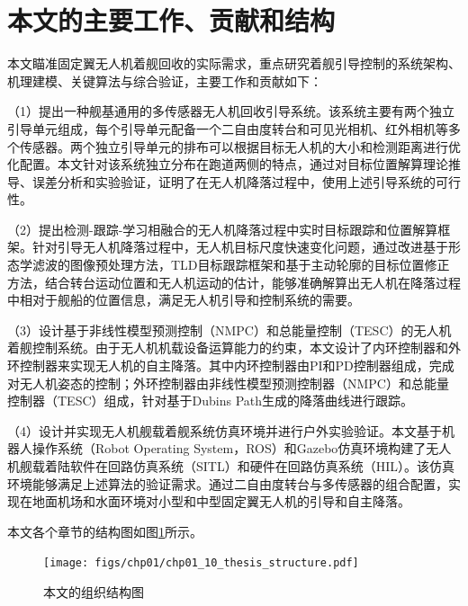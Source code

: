 \section{本文的主要工作、贡献和结构}
本文瞄准固定翼无人机着舰回收的实际需求，重点研究着舰引导控制的系统架构、机理建模、关键算法与综合验证，主要工作和贡献如下：

（1）提出一种舰基通用的多传感器无人机回收引导系统。该系统主要有两个独立引导单元组成，每个引导单元配备一个二自由度转台和可见光相机、红外相机等多个传感器。两个独立引导单元的排布可以根据目标无人机的大小和检测距离进行优化配置。本文针对该系统独立分布在跑道两侧的特点，通过对目标位置解算理论推导、误差分析和实验验证，证明了在无人机降落过程中，使用上述引导系统的可行性。

（2）提出检测-跟踪-学习相融合的无人机降落过程中实时目标跟踪和位置解算框架。针对引导无人机降落过程中，无人机目标尺度快速变化问题，通过改进基于形态学滤波的图像预处理方法，TLD目标跟踪框架和基于主动轮廓的目标位置修正方法，结合转台运动位置和无人机运动的估计，能够准确解算出无人机在降落过程中相对于舰船的位置信息，满足无人机引导和控制系统的需要。

（3）设计基于非线性模型预测控制（NMPC）和总能量控制（TESC）的无人机着舰控制系统。由于无人机机载设备运算能力的约束，本文设计了内环控制器和外环控制器来实现无人机的自主降落。其中内环控制器由PI和PD控制器组成，完成对无人机姿态的控制；外环控制器由非线性模型预测控制器（NMPC）和总能量控制器（TESC）组成，针对基于Dubins Path生成的降落曲线进行跟踪。

（4）设计并实现无人机舰载着舰系统仿真环境并进行户外实验验证。本文基于机器人操作系统（Robot Operating System，ROS）和Gazebo仿真环境构建了无人机舰载着陆软件在回路仿真系统（SITL）和硬件在回路仿真系统（HIL）。该仿真环境能够满足上述算法的验证需求。通过二自由度转台与多传感器的组合配置，实现在地面机场和水面环境对小型和中型固定翼无人机的引导和自主降落。

本文各个章节的结构图如图\ref{fig:chp01_10_thesis_structure}所示。
\begin{figure}[!h]   
	\centering	
	\texttt{[image: figs/chp01/chp01\_10\_thesis\_structure.pdf]}
	\caption{本文的组织结构图}
	\label{fig:chp01_10_thesis_structure}
\end{figure}
